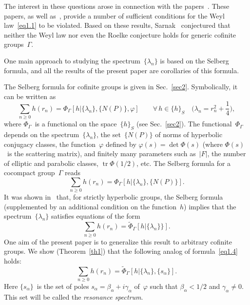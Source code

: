 \documentclass{amsart}
\theoremstyle{plain}
\theoremstyle{definition}
\numberwithin{equation}{section}
\begin{document}
The interest in these questions arose in connection with the
papers~\cite{5,6}. These papers, as well as~\cite{7,8,9}, provide a
number of sufficient conditions for the Weyl law~\eqref{eq1.1} to
be violated. Based on these results, Sarnak~\cite{2} conjectured
that neither the Weyl law nor even the Roelke conjecture holds for
generic cofinite groups~$\Gamma$.

One main approach to studying the spectrum~$\{\lambda_n\}$ is based
on the Selberg formula, and all the results of the present paper
are corollaries of this formula.

The Selberg formula for cofinite groups is given in
Sec.~\ref{sec2}. Symbolically, it can be written as
\begin{equation}
\label{eq1.2}
\sum_{n \geqslant 0}h(r_n)=
\Phi_\Gamma[h|\{\lambda_n\},\{N(P)\},\varphi] \qquad
\forall\,h\in\{h\}_S \quad
\biggl(\lambda_n=r_n^2+\frac14\biggr),
\end{equation}
where $\Phi_\Gamma$~is a functional on the space~$\{h\}_S$ (see
Sec.~\ref{sec2}). The functional~$\Phi_\Gamma$ depends on the
spectrum~$\{\lambda_n\}$, the set~$\{N(P)\}$ of norms of hyperbolic
conjugacy classes, the function~$\varphi$ defined by
$\varphi(s)=\det\Phi(s)$ (where $\Phi(s)$~is the scattering
matrix), and finitely many parameters such as~$|F|$, the number of
elliptic and parabolic classes, $\operatorname{tr}\Phi(1/2)$, etc.
The Selberg formula for a cocompact group~$\Gamma$ reads
\begin{equation}
\label{eq1.3}
\sum_{n \geqslant 0}h(r_n)=\Phi_\Gamma[h|\{\lambda_n\},\{N(P)\}].
\end{equation}
It was shown in~\cite{10} that, for strictly hyperbolic groups, the
Selberg formula (supplemented by an additional condition on the
function~$h$) implies that the spectrum~$\{\lambda_n\}$ satisfies
equations of the form
\begin{equation}
\label{eq1.4}
\sum_{n \geqslant 0}h(r_n)=\widetilde\Phi_\Gamma[h|\{\lambda_n\}\}].
\end{equation}
One aim of the present paper is to generalize this result to
arbitrary cofinite groups. We show (Theorem~\ref{th1}) that the
following analog of formula~\eqref{eq1.4} holds:
\begin{equation}
\label{eq1.5}
\sum_{n \geqslant 0}h(r_n)=
\widetilde\Phi_\Gamma[h|\{\lambda_n\},\{s_\alpha\}].
\end{equation}
Here $\{s_\alpha\}$~is the set of poles
$s_\alpha=\beta_\alpha+i\gamma_\alpha$ of~$\varphi$ such that
$\beta_\alpha<1/2$ and $\gamma_\alpha\ne0$. This set will be called
the \textit{resonance spectrum}.
\end{document}

